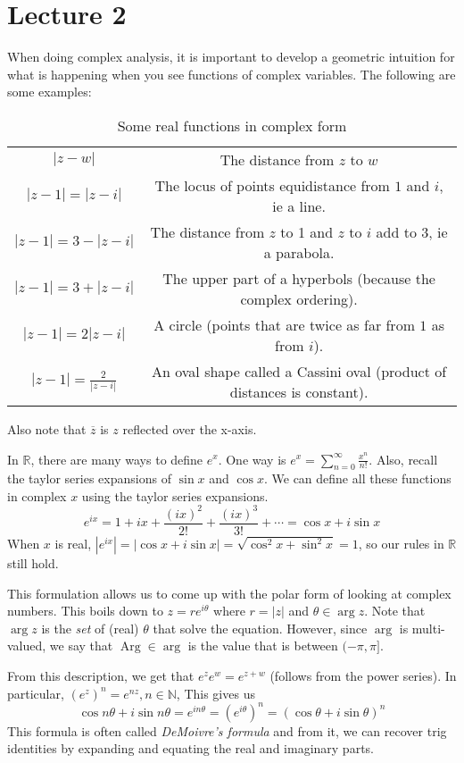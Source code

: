 \documentclass[11pt,leqno,oneside]{amsart}
\newcommand{\N}{{\mathbb N}} %
\newcommand{\R}{{\mathbb R}} %
\newcommand{\ov}{\overline} %
\newcommand{\Arg}{\operatorname{Arg}}
\theoremstyle{definition}
\numberwithin{equation}{section}
\begin{document}
\section{Lecture 2}
When doing complex analysis, it is important to develop a geometric intuition
for what is happening when you see functions of complex variables. The
following are some examples:
\begin{table}
    \centering
    \begin{tabular}{|c|c|}
        \hline
        $|z-w|$ & The distance from $z$ to $w$ \\
        $|z-1|=|z-i|$ & The locus of points equidistance from $1$ and $i$, ie a line. \\
        $|z-1|=3-|z-i|$ & The distance from $z$ to 1 and $z$ to $i$ add to 3, ie a parabola. \\
        $|z-1|=3+|z-i|$ & The upper part of a hyperbols (because the complex ordering). \\
        $|z-1|=2|z-i|$ & A circle (points that are twice as far from $1$ as from $i$). \\
        $|z-1|=\frac{2}{|z-i|}$ & An oval shape called a Cassini oval (product of distances is constant). \\
        \hline
    \end{tabular}
    \caption{Some real functions in complex form}
    \label{tab:func-descs}
\end{table}
Also note that $\ov{z}$ is $z$ reflected over the x-axis. 

In $\R$, there are many ways to define $e^x$. One way is $e^x =
\sum_{n=0}^\infty \frac{x^n}{n!}$. Also, recall the taylor series expansions of
$\sin x$ and $\cos x$. We can define all these functions in complex $x$ using
the taylor series expansions. 
\[
    e^{ix} = 1 + ix + \frac{(ix)^2}{2!} + \frac{(ix)^3}{3!} + \cdots = \cos x + i \sin x
\]
When $x$ is real, $|e^{ix}| = |\cos x + i \sin x| = \sqrt{\cos^2 x + \sin^2 x}
= 1$, so our rules in $\R$ still hold. 

This formulation allows us to come up with the polar form of looking at complex
numbers. This boils down to $z = r e^{i \theta}$ where $r = |z|$ and $\theta
\in \arg z$. Note that $\arg z$ is the \emph{set} of (real) $\theta$ that solve
the equation. However, since $\arg$ is multi-valued, we say that $\Arg \in
\arg$ is the value that is between $(-\pi, \pi]$. 

From this description, we get that $e^z e^w = e^{z+w}$ (follows from the power series). In particular, $(e^z)^n = e^{nz}, n \in \N$, This gives us \[
    \cos n \theta + i \sin n \theta = e^{in\theta} = (e^{i\theta})^n = (\cos \theta + i \sin \theta)^n
\]
This formula is often called \emph{DeMoivre's formula} and from it, we can
recover trig identities by expanding and equating the real and imaginary parts. 
\end{document}
